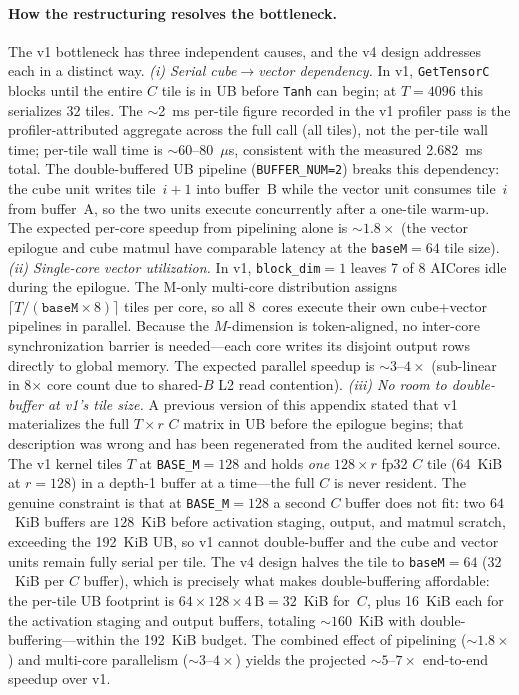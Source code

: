 \paragraph{How the restructuring resolves the bottleneck.}
The v1 bottleneck has three independent causes, and the v4 design addresses
each in a distinct way.  \emph{(i) Serial cube$\to$vector dependency.}  In v1,
\texttt{GetTensorC} blocks until the entire $C$ tile is in UB before
\texttt{Tanh} can begin; at $T{=}4096$ this serializes $32$ tiles.  The
$\sim$2~ms per-tile figure recorded in the v1 profiler pass is the
profiler-attributed aggregate across the full call (all tiles), not the
per-tile wall time; per-tile wall time is $\sim$60--80~$\mu$s, consistent
with the measured 2.682~ms total.  The double-buffered UB pipeline
(\texttt{BUFFER\_NUM=2}) breaks this dependency: the cube unit writes
tile~$i{+}1$ into buffer~B while the vector unit consumes tile~$i$ from
buffer~A, so the two units execute concurrently after a one-tile warm-up.
The expected per-core speedup from pipelining alone is ${\sim}1.8\times$
(the vector epilogue and cube matmul have comparable latency at the
\texttt{baseM}$=64$ tile size).  \emph{(ii) Single-core vector
utilization.}  In v1, \texttt{block\_dim}$=1$ leaves 7 of 8 AICores idle
during the epilogue.  The M-only multi-core distribution assigns
$\lceil T / (\texttt{baseM}\times 8)\rceil$ tiles per core, so all 8~cores
execute their own cube+vector pipelines in parallel.  Because the
$M$-dimension is token-aligned, no inter-core synchronization barrier is
needed---each core writes its disjoint output rows directly to global
memory.  The expected parallel speedup is ${\sim}3$--$4\times$ (sub-linear
in 8$\times$ core count due to shared-$B$ L2 read contention).
\emph{(iii) No room to double-buffer at v1's tile size.}  A previous
version of this appendix stated that v1 materializes the full $T\times r$
$C$ matrix in UB before the epilogue begins; that description was wrong and
has been regenerated from the audited kernel source.  The v1 kernel tiles
$T$ at \texttt{BASE\_M}$=128$ and holds \emph{one} $128\times r$ fp32 $C$
tile ($64$~KiB at $r{=}128$) in a depth-1 buffer at a time---the full $C$
is never resident.  The genuine constraint is that at \texttt{BASE\_M}$=128$
a second $C$ buffer does not fit: two $64$~KiB buffers are $128$~KiB before
activation staging, output, and matmul scratch, exceeding the 192~KiB UB,
so v1 cannot double-buffer and the cube and vector units remain fully
serial per tile.  The v4 design halves the tile to \texttt{baseM}$=64$
($32$~KiB per $C$ buffer), which is precisely what makes double-buffering
affordable: the per-tile UB footprint is
$64\times128\times4\,\text{B}=32$~KiB for~$C$, plus 16~KiB each for the
activation staging and output buffers, totaling ${\sim}160$~KiB with
double-buffering---within the 192~KiB budget.  The combined effect of
pipelining (${\sim}1.8\times$) and multi-core parallelism
(${\sim}3$--$4\times$) yields the projected ${\sim}5$--$7\times$ end-to-end
speedup over v1.

